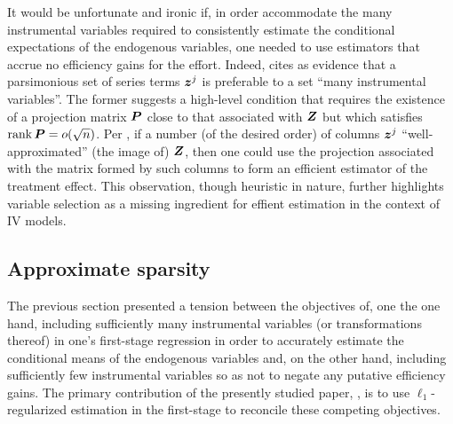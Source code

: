 \documentclass{uwstat572}
\theoremstyle{definition}
\theoremstyle{remark}
\newcommand{\rank}{\mathrm{rank} \,}
\numberwithin{equation}{section}
\begin{document}
It would be unfortunate and ironic if, in order accommodate the many instrumental variables required to consistently estimate the conditional expectations of the endogenous variables, one needed to use estimators that accrue no efficiency gains for the effort. Indeed, \cite{H02} cites \cite{N97} as evidence that a parsimonious set of series terms $\z^j$ is preferable to a set ``many instrumental variables''. The former suggests a high-level condition that requires the existence of a projection matrix $\P$ close to that associated with $\Z$ but which satisfies $\rank \P = o(\sqrt{n})$. Per \cite{H02}, if a number (of the desired order) of columns $\z^j$ ``well-approximated'' (the image of) $\Z$, then one could use the projection associated with the matrix formed by such columns to form an efficient estimator of the treatment effect. This observation, though heuristic in nature, further highlights variable selection as a missing ingredient for effient estimation in the context of IV models.


%
\subsection{Approximate sparsity}\label{ss:sparsity}


The previous section presented a tension between the objectives of, one the one hand, including sufficiently many instrumental variables (or transformations thereof) in one's first-stage regression in order to accurately estimate the conditional means of the endogenous variables and, on the other hand, including sufficiently few instrumental variables so as not to negate any putative efficiency gains. The primary contribution of the presently studied paper, \cite{BCH11}, is to use $\ell_1$-regularized estimation in the first-stage to reconcile these competing objectives. 
\end{document}
